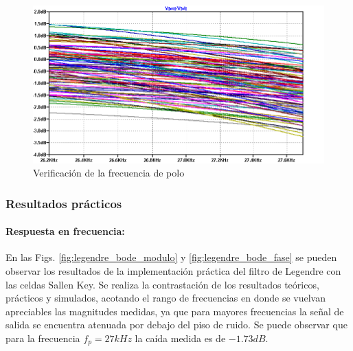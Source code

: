 \begin{figure}[H]
    \centering
    \includegraphics[scale=0.6]{../EJ1/Recursos/legendre_verificacion_fp.png}
    \caption{Verificaci\'on de la frecuencia de polo}
\end{figure}

\subsubsection{Resultados pr\'acticos}

\paragraph{Respuesta en frecuencia:} En las Figs. \ref{fig:legendre_bode_modulo} y \ref{fig:legendre_bode_fase} se pueden observar los resultados de la implementaci\'on
pr\'actica del filtro de Legendre con las celdas Sallen Key. Se realiza la contrastaci\'on de los resultados te\'oricos, pr\'acticos y simulados, acotando el rango de frecuencias
en donde se vuelvan apreciables las magnitudes medidas, ya que para mayores frecuencias la se\~nal de salida se encuentra atenuada por debajo del piso de ruido. Se puede observar que para
la frecuencia $f_p = 27kHz$ la ca\'ida medida es de $-1.73dB$.

